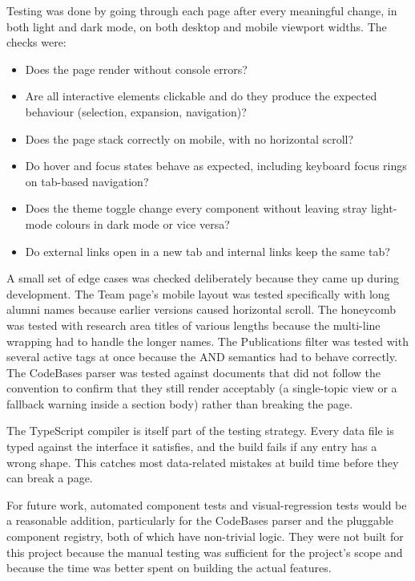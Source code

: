 Testing was done by going through each page after every meaningful change, in both light and dark mode, on both desktop and mobile viewport widths. The checks were:

\begin{itemize}
	\item Does the page render without console errors?
	\item Are all interactive elements clickable and do they produce the expected behaviour (selection, expansion, navigation)?
	\item Does the page stack correctly on mobile, with no horizontal scroll?
	\item Do hover and focus states behave as expected, including keyboard focus rings on tab-based navigation?
	\item Does the theme toggle change every component without leaving stray light-mode colours in dark mode or vice versa?
	\item Do external links open in a new tab and internal links keep the same tab?
\end{itemize}

A small set of edge cases was checked deliberately because they came up during development. The Team page's mobile layout was tested specifically with long alumni names because earlier versions caused horizontal scroll. The honeycomb was tested with research area titles of various lengths because the multi-line wrapping had to handle the longer names. The Publications filter was tested with several active tags at once because the AND semantics had to behave correctly. The CodeBases parser was tested against documents that did not follow the convention to confirm that they still render acceptably (a single-topic view or a fallback warning inside a section body) rather than breaking the page.

The TypeScript compiler is itself part of the testing strategy. Every data file is typed against the interface it satisfies, and the build fails if any entry has a wrong shape. This catches most data-related mistakes at build time before they can break a page.

For future work, automated component tests and visual-regression tests would be a reasonable addition, particularly for the CodeBases parser and the pluggable component registry, both of which have non-trivial logic. They were not built for this project because the manual testing was sufficient for the project's scope and because the time was better spent on building the actual features.